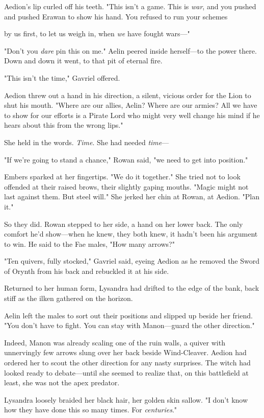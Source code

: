 Aedion's lip curled off his teeth. "This isn't a game. This is
\emph{war}, and you pushed and pushed Erawan to show his hand. You refused to run your schemes

by us first, to let us weigh in, when \emph{we} have fought wars---"

"Don't you \emph{dare} pin this on me." Aelin peered inside herself---to the power there. Down and down it went, to that pit of eternal fire.

"This isn't the time," Gavriel offered.

Aedion threw out a hand in his direction, a silent, vicious order for the Lion to shut his mouth. "Where are our allies, Aelin? Where are our armies? All we have to show for our efforts is a Pirate Lord who might very well change his mind if he hears about this from the wrong lips."

She held in the words. \emph{Time}. She had needed \emph{time}---

"If we're going to stand a chance," Rowan said, "we need to get into position."

Embers sparked at her fingertips. "We do it together." She tried not to look offended at their raised brows, their slightly gaping mouths. "Magic might not last against them. But steel will." She jerked her chin at Rowan, at Aedion. "Plan it."

So they did. Rowan stepped to her side, a hand on her lower back. The only comfort he'd show---when he knew, they both knew, it hadn't been his argument to win. He said to the Fae males, "How many arrows?"

"Ten quivers, fully stocked," Gavriel said, eyeing Aedion as he removed the Sword of Orynth from his back and rebuckled it at his side.

Returned to her human form, Lysandra had drifted to the edge of the bank, back stiff as the ilken gathered on the horizon.

Aelin left the males to sort out their positions and slipped up beside her friend. "You don't have to fight. You can stay with Manon---guard the other direction."

Indeed, Manon was already scaling one of the ruin walls, a quiver with unnervingly few arrows slung over her back beside Wind-Cleaver. Aedion had ordered her to scout the other direction for any nasty surprises. The witch had looked ready to debate---until she seemed to realize that, on this battlefield at least, she was not the apex predator.

Lysandra loosely braided her black hair, her golden skin sallow. "I don't know how they have done this so many times. For
\emph{centuries}."

